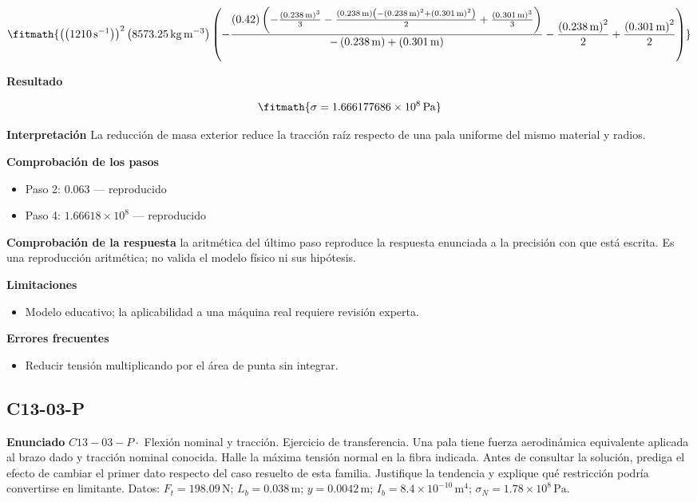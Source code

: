\documentclass[10pt,openany]{book}
\begin{document}
\[
\fitmath{\left(\left(1210\,\mathrm{s}^{-1}\right)\right)^{2} \left(8573.25\,\mathrm{kg}\,\mathrm{m}^{-3}\right) \left(- \frac{\left(0.42\right) \left(- \frac{\left(0.238\,\mathrm{m}\right)^{3}}{3} - \frac{\left(0.238\,\mathrm{m}\right) \left(- \left(0.238\,\mathrm{m}\right)^{2} + \left(0.301\,\mathrm{m}\right)^{2}\right)}{2} + \frac{\left(0.301\,\mathrm{m}\right)^{3}}{3}\right)}{- \left(0.238\,\mathrm{m}\right) + \left(0.301\,\mathrm{m}\right)} - \frac{\left(0.238\,\mathrm{m}\right)^{2}}{2} + \frac{\left(0.301\,\mathrm{m}\right)^{2}}{2}\right)}
\]

\noindent\textbf{Resultado}

\[
\fitmath{\sigma=1.666177686\times10^{8}\,\mathrm{Pa}}
\]

\noindent\textbf{Interpretación}
La reducción de masa exterior reduce la tracción raíz respecto de una pala uniforme del mismo material y radios.

\noindent\textbf{Comprobación de los pasos}
\begin{itemize}
\item Paso 2: $0.063$ — reproducido
\item Paso 4: $1.66618\times 10^{8}$ — reproducido
\end{itemize}

\noindent\textbf{Comprobación de la respuesta} la aritmética del último paso reproduce la respuesta enunciada a la precisión con que está escrita. Es una reproducción aritmética; no valida el modelo físico ni sus hipótesis.

\noindent\textbf{Limitaciones}
\begin{itemize}
\item Modelo educativo; la aplicabilidad a una máquina real requiere revisión experta.
\end{itemize}

\noindent\textbf{Errores frecuentes}
\begin{itemize}
\item Reducir tensión multiplicando por el área de punta sin integrar.
\end{itemize}
\subsection*{C13-03-P}

\noindent\textbf{Enunciado}
\(C13-03-P \cdot\) Flexión nominal y tracción. Ejercicio de transferencia. Una pala tiene fuerza aerodinámica equivalente aplicada al brazo dado y tracción nominal conocida. Halle la máxima tensión normal en la fibra indicada. Antes de consultar la solución, prediga el efecto de cambiar el primer dato respecto del caso resuelto de esta familia. Justifique la tendencia y explique qué restricción podría convertirse en limitante. Datos: \(F_t=198.09\, \mathrm{N}\); \(L_b=0.038\, \mathrm{m}\); \(y=0.0042\, \mathrm{m}\); \(I_b=8.4\times 10^{-10}\, \mathrm{m}^{4}\); \(\sigma_N=1.78\times 10^{8}\, \mathrm{Pa}\).
\end{document}
